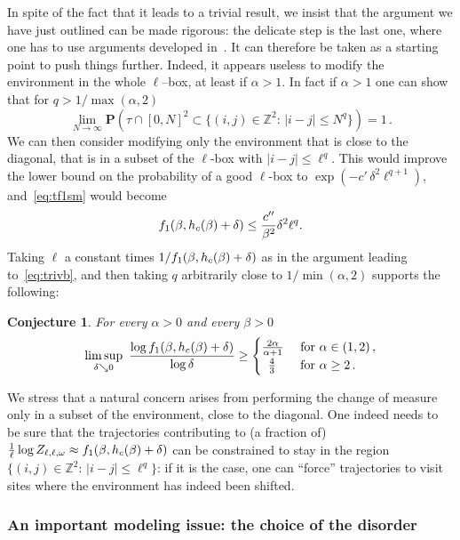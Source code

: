 \documentclass[11pt]{article}
\newtheorem{conj}[theo]{Conjecture}
\theoremstyle{definition}
\numberwithin{equation}{section}
\numberwithin{figure}{section}
\numberwithin{table}{section}
\newcommand{\ga}{\alpha}
\newcommand{\gb}{\beta}
\newcommand{\gd}{\delta}
\newcommand{\go}{\omega}
\newcommand{\tf}{\textsc{f}} %
\newcommand{\bP}{\ensuremath{\mathbf{P}}}
\newcommand{\bbZ}{\ensuremath{\mathbb{Z}}}
\begin{document}
In spite of the fact that it leads to a trivial result, we insist that the argument we have just outlined can be made rigorous: the delicate step is the last one, where one has to use arguments developed in~\cite{cf:GTalea}. It can therefore be taken as a starting point to push things further. Indeed, it appears useless to modify the environment in the whole $\ell$--box, at least if $\ga>1$. In fact if $\ga>1$ one can show that for $q>1/ \max(\ga,2)$
\begin{equation}\label{eq:evin}
\lim_{N \to \infty}\bP \left(\tau \cap [0, N]^2 \subset \{(i,j) \in \bbZ^2:\,\vert i-j \vert \le N^q \}\right)= 1\,.
\end{equation}
We can then consider modifying only the environment that is close to the diagonal, that is in a subset of the $\ell$-box with $|i-j|\leq \ell^q$. This would improve the lower bound on the probability of a good $\ell$-box to $\exp(- c'\,\gd^2 \ell^{q+1})$, and~\eqref{eq:tf1sm} would become
\[
\tf_1(\gb,h_c(\gb)+\gd) \leq \frac{c''}{\gb^2} \gd^2 \ell^{q}.
\]
Taking $\ell$ a constant times $1/\tf_1(\gb,h_c(\gb)+\gd)$ as in the argument leading to~\eqref{eq:trivb}, and then taking $q$ arbitrarily close to $1/\min(\alpha,2)$ supports the following:
\begin{conj}
For every $\ga>0$ and every $\gb >0$\label{conj:smoothing}
\begin{equation}
\limsup_{\gd \searrow 0} \
\frac{\log \tf_1 (\gb, h_c(\gb)+\gd) }{\log \gd}\ge
\begin{cases}
\frac{2\ga}{\ga+1} & \text{ for } \ga \in (1,2)\,,
\\
\;\:\frac{4}{3} & \text{ for } \ga \ge 2\,.
\end{cases}
\end{equation}
\end{conj}

We stress that a natural concern arises from performing the change of measure only in a subset of the environment, close to the diagonal. One indeed needs to be sure that the trajectories contributing to (a fraction of) $ \frac{1}{\ell} \log Z_{\ell,\ell,\go} \approx \tf_1(\gb,h_c(\gb)+\gd)$ can be constrained to stay in the region $\{(i,j) \in \bbZ^2:\,\vert i-j \vert \le \ell^q \}$: if it is the case, one can ``force'' trajectories to visit sites where the environment has indeed been shifted.

\subsubsection{An important modeling issue: the choice of the disorder}
\end{document}
